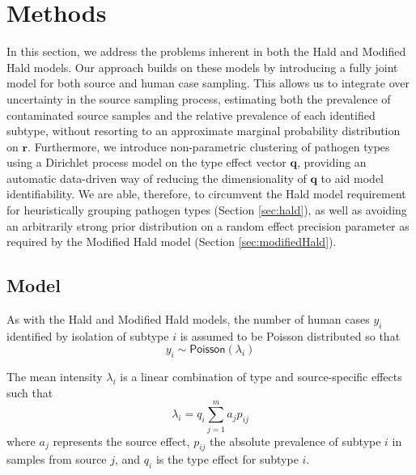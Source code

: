\section{Methods} \label{sec:methods}

In this section, we address the problems inherent in both the Hald and Modified Hald models.  Our approach builds on these models by introducing a fully joint model for both source and human case 
sampling.  This allows us to integrate over uncertainty in the source sampling process, estimating both the prevalence of contaminated source samples and the relative prevalence of each identified 
subtype, without resorting to an approximate marginal probability distribution on $\bm{r}$.  Furthermore, we introduce non-parametric clustering of pathogen types using a Dirichlet process model on 
the type effect vector $\bm{q}$, providing an automatic data-driven way of reducing the dimensionality of $\bm{q}$ to aid model identifiability.  We are able, therefore, to circumvent the Hald model 
requirement for heuristically grouping pathogen types (Section \ref{sec:hald}), as well as avoiding an arbitrarily strong prior distribution on a random effect precision parameter as required by 
the Modified Hald model (Section \ref{sec:modifiedHald}).  

\subsection{Model} \label{sec:model}

As with the Hald and Modified Hald models, the number of human cases $y_i$ identified by isolation of subtype $i$ is assumed to be Poisson distributed so that
\begin{equation}\label{eq:likelihood}
y_{i}\sim \textsf{Poisson}(\lambda_{i})
\end{equation}

The mean intensity $\lambda_{i}$ is a linear combination of type and source-specific effects such that
\begin{equation}
\lambda_i = q_{i} \sum_{j=1}^{m} a_{j} p_{ij}
\end{equation}
where $a_j$ represents the source effect, $p_{ij}$ the absolute prevalence of subtype $i$ in samples from source $j$, and $q_{i}$ is the type effect for subtype $i$.

